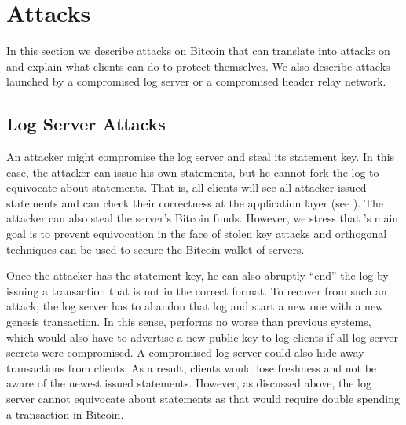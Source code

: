 \section{Attacks}
\label{sec:attacks}
In this section we describe attacks on Bitcoin that can translate into attacks on \Sys and explain what \Sys clients can do to protect themselves.
We also describe attacks launched by a compromised log server or a compromised header relay network.


\subsection{Log Server Attacks}
An attacker might compromise the \Sys log server and steal its statement key.
In this case, the attacker can issue his own statements, but he cannot fork the log to equivocate about statements.
That is, all clients will see all attacker-issued statements and can check their correctness at the application layer (see ).
The attacker can also steal the server's Bitcoin funds.
However, we stress that \Sys's main goal is to prevent equivocation in the face of stolen key attacks and orthogonal techniques can be used to secure the Bitcoin wallet of \Sys servers\cite{bitcoin-threshold-ecdsa}.

Once the attacker has the statement key, he can also abruptly ``end'' the log by issuing a transaction that is not in the correct \Sys format.
To recover from such an attack, the \Sys log server has to abandon that log and start a new one with a new genesis transaction.
In this sense, \Sys performs no worse than previous systems, which would also have to advertise a new public key to log clients if all log server secrets were compromised.
A compromised log server could also hide away transactions from \Sys clients.
As a result, \Sys clients would lose freshness and not be aware of the newest issued statements.
However, as discussed above, the log server cannot equivocate about statements as that would require double spending a transaction in Bitcoin.


